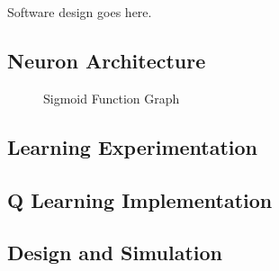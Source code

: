Software design goes here.

\subsection{Neuron Architecture}

\begin{figure}
	\centering
	
	\caption{Sigmoid Function Graph}
\end{figure}




\subsection{Learning Experimentation}


\subsection{Q Learning Implementation}

\subsection{Design and Simulation}
